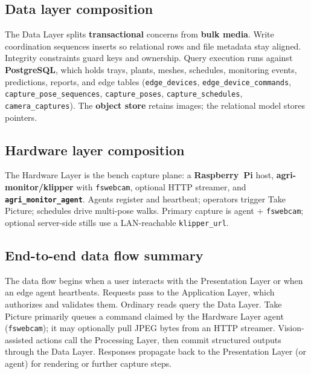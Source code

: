 \subsection{Data layer composition}

The Data Layer splits \textbf{transactional} concerns from \textbf{bulk media}. Write coordination sequences inserts so relational rows and file metadata stay aligned. Integrity constraints guard keys and ownership. Query execution runs against \textbf{PostgreSQL}, which holds trays, plants, meshes, schedules, monitoring events, predictions, reports, and edge tables (\texttt{edge\_devices}, \texttt{edge\_device\_commands}, \texttt{capture\_pose\_sequences}, \texttt{capture\_poses}, \texttt{capture\_schedules}, \texttt{camera\_captures}). The \textbf{object store} retains images; the relational model stores pointers.

\subsection{Hardware layer composition}

The Hardware Layer is the bench capture plane: a \textbf{Raspberry~Pi} host, \textbf{agri-monitor/klipper} with \texttt{fswebcam}, optional HTTP streamer, and \textbf{\texttt{agri\_monitor\_agent}}. Agents register and heartbeat; operators trigger Take Picture; schedules drive multi-pose walks. Primary capture is agent + \texttt{fswebcam}; optional server-side stills use a LAN-reachable \texttt{klipper\_url}.

\subsection{End-to-end data flow summary}

The data flow begins when a user interacts with the Presentation Layer or when an edge agent heartbeats. Requests pass to the Application Layer, which authorizes and validates them. Ordinary reads query the Data Layer. Take Picture primarily queues a command claimed by the Hardware Layer agent (\texttt{fswebcam}); it may optionally pull JPEG bytes from an HTTP streamer. Vision-assisted actions call the Processing Layer, then commit structured outputs through the Data Layer. Responses propagate back to the Presentation Layer (or agent) for rendering or further capture steps.

